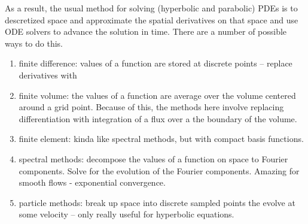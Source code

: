As a result, the usual method for solving (hyperbolic and parabolic) PDEs is to descretized space and approximate the spatial derivatives on that space and use ODE solvers to advance the solution in time.  There are a number of possible ways to do this. 
\begin{enumerate}
    \item finite difference: values of a function are stored at discrete points -- replace derivatives with 
    \item finite volume: the values of a function are average over the volume centered around a grid point.  Because of this, the methods here involve replacing differentiation with integration of a flux over a the boundary of the volume.
    \item finite element: kinda like spectral methods, but with compact basis functions. 
    \item spectral methods: decompose the values of a function on space to Fourier components. Solve for the evolution of the Fourier components. Amazing for smooth flows - exponential convergence.
    \item particle methods: break up space into discrete sampled points the evolve at some velocity -- only really useful for hyperbolic equations.
\end{enumerate}







